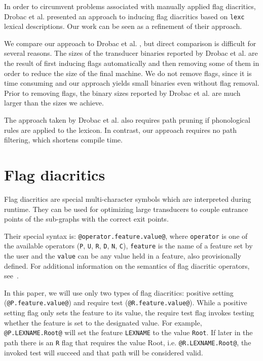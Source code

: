 \documentclass[11pt]{article}
\begin{document}
In order to circumvent problems associated with manually applied flag
diacritics, Drobac et al.  presented an approach
to inducing flag diacritics based on \texttt{lexc} lexical descriptions. Our work can be seen
as a refinement of their approach.

We compare our approach to Drobac et
al. , but direct comparison is difficult for
several reasons. The sizes of the transducer binaries reported by
Drobac et al.  are the result of first inducing
flags automatically and then removing some of them in order to reduce
the size of the final machine. We do not remove flags, since it is
time consuming and our approach yields small binaries even without
flag removal. Prior to removing flags, the binary sizes reported by
Drobac et al.  are much larger than the sizes we
achieve.

The approach taken by Drobac et al.  also
requires path pruning if phonological rules are applied to the
lexicon. In contrast, our
approach requires no path filtering, which shortens compile time.

\section{Flag diacritics}
\label{sec:flags}

Flag diacritics are special multi-character symbols which are interpreted during runtime. They can be used for optimizing large transducers to couple entrance points of the sub-graphs with the correct exit points.

Their special syntax is: \verb+@operator.feature.value@+, where
\texttt{operator} is one of the available operators (\verb+P+, \verb+U+, \verb+R+, \verb+D+, \verb+N+, \verb+C+), \texttt{feature} is the name of a feature set by the user and the \texttt{value} can be any value held in a feature, also provisionally defined. For additional information on the semantics of flag diacritic operators, see~.


In this paper, we will use only two types of flag diacritics: positive
setting (\verb+@P.feature.value@+) and require test
(\verb+@R.feature.value@+). While a positive setting flag only sets the
feature to its value, the require test flag invokes testing whether the
feature is set to the designated value. For example,
\verb+@P.LEXNAME.Root@+ will set the feature \texttt{LEXNAME} to the value
\texttt{Root}. If later in the path there is an \verb+R+ flag that requires the value Root, i.e.
\verb+@R.LEXNAME.Root@+, the invoked test will succeed and that path
will be considered valid.
\end{document}
